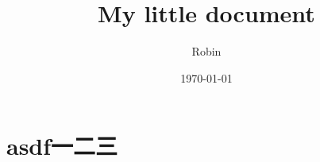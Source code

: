 \documentclass[nofonts]{ctexart}
\author{Robin}
\date{\today}
\title{My little document}
\begin{document}
\maketitle
\tableofcontents


\section{asdf一二三}
\label{sec:orgheadline1}
\end{document}
